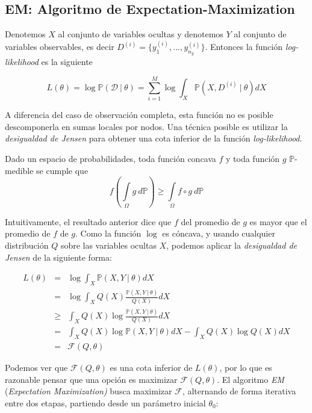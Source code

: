 \subsection{EM: Algoritmo de Expectation-Maximization}

Denotemos $X$ al conjunto de variables ocultas y denotemos $Y$ al conjunto de variables observables, es decir $D^{(i)}=\{y_{1}^{(i)},...,y_{n_{y}}^{(i)}\}.$ Entonces la función \emph{log-likelihood} es la siguiente

\begin{equation*}
L(\theta )=\log \mathbb{P}(\mathcal{D}\ |\ \theta
)=\sum\limits_{i=1}^{M}\log \int_{X}\mathbb{P}(X,D^{(i)}\ |\ \theta )dX
\end{equation*}

A diferencia del caso de observación completa, esta función no es posible descomponerla en sumas locales por nodos. Una técnica posible es utilizar la \emph{desigualdad de Jensen} para obtener una cota inferior de la función \emph{log-likelihood}.

\begin{theorem}
	Dado un espacio de probabilidades, toda función concava $f$ y toda función $g$ $\mathbb{P}$-medible se cumple que 
	\begin{equation*}
	f\left( \int\limits_{\Omega }g\ d\mathbb{P}\right) \geq \int\limits_{\Omega
	}f\circ g\ d\mathbb{P}
	\end{equation*}
\end{theorem}

Intuitivamente, el resultado anterior dice que $f$ del promedio de $g$ es mayor que el promedio de $f$ de $g$. Como la función $\log $ es cóncava, y usando cualquier distribución $Q$ sobre las variables ocultas $X$, podemos aplicar la \emph{desigualdad de Jensen} de la siguiente forma:

\begin{eqnarray*}
	L(\theta ) &=&\log \int_{X}\mathbb{P}(X,Y\ |\ \theta )dX \\
	&=&\log \int_{X}Q(X)\frac{\mathbb{P}(X,Y\ |\ \theta )}{Q(X)}dX \\
	&\geq &\int_{X}Q(X)\log \frac{\mathbb{P}(X,Y\ |\ \theta )}{Q(X)}dX \\
	&=&\int_{X}Q(X)\log \mathbb{P}(X,Y\ |\ \theta )dX-\int_{X}Q(X)\log Q(X)dX \\
	&=&\mathcal{F}(Q,\theta )
\end{eqnarray*}

Podemos ver que $\mathcal{F}(Q,\theta )$ es una cota inferior de $L(\theta )$, por lo que es razonable pensar que una opción es maximizar $\mathcal{F}(Q,\theta )$. El algoritmo \emph{EM} (\emph{Expectation Maximization)} busca maximizar $\mathcal{F}$, alternando de forma iterativa entre dos etapas, partiendo desde un parámetro inicial $\theta _{0}:$

